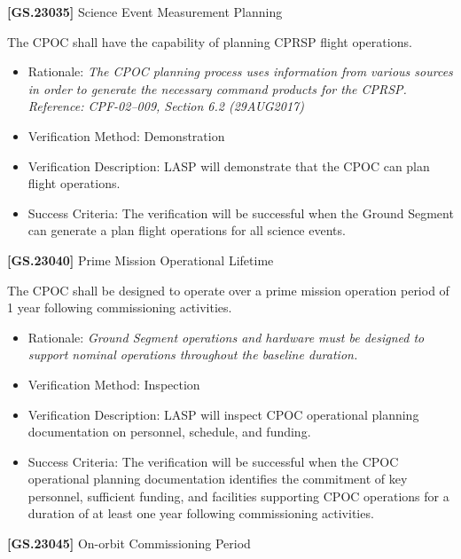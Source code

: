 \documentclass[12pt,oneside,oldfontcommands]{memoir}
\begin{document}
\textbf{[GS.23035]} Science Event Measurement Planning

The \gls{CPOC} shall have the capability of planning \gls{CPRSP} flight operations.

\begin{itemize}
\item{} Rationale: \emph{The CPOC planning process uses information from various sources in order to generate the necessary command products for the CPRSP. Reference: CPF-02--009, Section 6.2 (29AUG2017)}

\item{} Verification Method: Demonstration

\item{} Verification Description: \gls{LASP} will demonstrate that the \gls{CPOC} can plan flight operations.

\item{} Success Criteria: The verification will be successful when the Ground Segment can generate a plan flight operations for all science events.

\end{itemize}

\textbf{[GS.23040]} Prime Mission Operational Lifetime

The \gls{CPOC} shall be designed to operate over a prime mission operation period of 1 year following commissioning activities.

\begin{itemize}
\item{} Rationale: \emph{Ground Segment operations and hardware must be designed to support nominal operations throughout the baseline duration.}

\item{} Verification Method: Inspection

\item{} Verification Description: \gls{LASP} will inspect \gls{CPOC} operational planning documentation on personnel, schedule, and funding.

\item{} Success Criteria: The verification will be successful when the \gls{CPOC} operational planning documentation identifies the commitment of key personnel, sufficient funding, and facilities supporting \gls{CPOC} operations for a duration of at least one year following commissioning activities.

\end{itemize}

\textbf{[GS.23045]} On-orbit Commissioning Period
\end{document}

